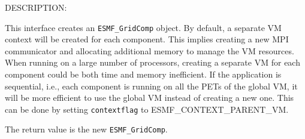 {\sf DESCRIPTION:\\ }


   This interface creates an {\tt ESMF\_GridComp} object. By default, a
   separate VM context will be created for each component.  This implies
   creating a new MPI communicator and allocating additional memory to
   manage the VM resources. When running on a large number of processors,
   creating a separate VM for each component could be both time and memory
   inefficient.  If the application is sequential, i.e., each component is
   running on all the PETs of the global VM, it will be more efficient to use
   the global VM instead of creating a new one.  This can be done by setting
   {\tt contextflag} to ESMF\_CONTEXT\_PARENT\_VM.
  
   The return value is the new {\tt ESMF\_GridComp}.
  
